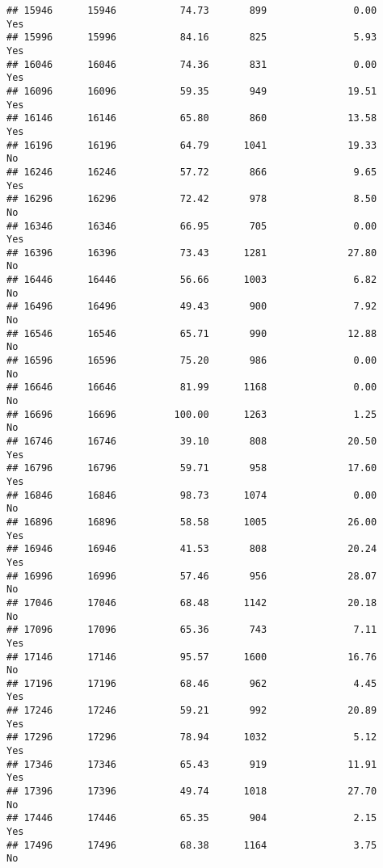 \documentclass[
]{article}
\begin{document}
\begin{verbatim}
## 15946      15946           74.73       899               0.00               Yes
## 15996      15996           84.16       825               5.93               Yes
## 16046      16046           74.36       831               0.00               Yes
## 16096      16096           59.35       949              19.51               Yes
## 16146      16146           65.80       860              13.58               Yes
## 16196      16196           64.79      1041              19.33                No
## 16246      16246           57.72       866               9.65               Yes
## 16296      16296           72.42       978               8.50                No
## 16346      16346           66.95       705               0.00               Yes
## 16396      16396           73.43      1281              27.80                No
## 16446      16446           56.66      1003               6.82                No
## 16496      16496           49.43       900               7.92                No
## 16546      16546           65.71       990              12.88                No
## 16596      16596           75.20       986               0.00                No
## 16646      16646           81.99      1168               0.00                No
## 16696      16696          100.00      1263               1.25                No
## 16746      16746           39.10       808              20.50               Yes
## 16796      16796           59.71       958              17.60               Yes
## 16846      16846           98.73      1074               0.00                No
## 16896      16896           58.58      1005              26.00               Yes
## 16946      16946           41.53       808              20.24               Yes
## 16996      16996           57.46       956              28.07                No
## 17046      17046           68.48      1142              20.18                No
## 17096      17096           65.36       743               7.11               Yes
## 17146      17146           95.57      1600              16.76                No
## 17196      17196           68.46       962               4.45               Yes
## 17246      17246           59.21       992              20.89               Yes
## 17296      17296           78.94      1032               5.12               Yes
## 17346      17346           65.43       919              11.91               Yes
## 17396      17396           49.74      1018              27.70                No
## 17446      17446           65.35       904               2.15               Yes
## 17496      17496           68.38      1164               3.75                No

\end{verbatim}
\end{document}
